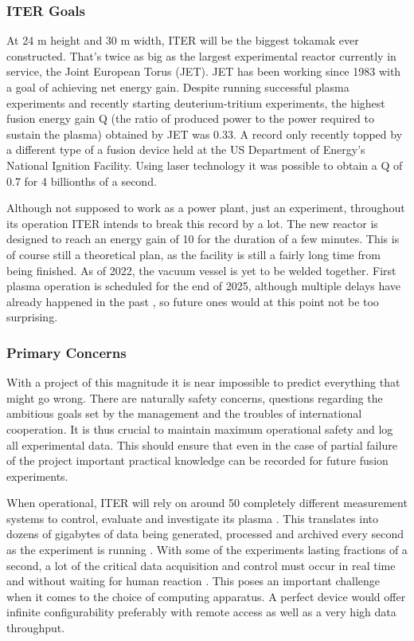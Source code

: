   \subsubsection{ITER Goals}

	At 24 m height and 30 m width, 
	ITER will be the biggest tokamak ever constructed. 
	That's twice as big as the largest experimental reactor currently in service, 
	the Joint European Torus (JET). JET has been working since 1983 with 
	a goal of achieving net energy gain. Despite running successful 
	plasma experiments and recently starting deuterium-tritium experiments,
	the highest fusion energy gain Q 
	(the ratio of produced power to the power required to sustain the plasma)
	obtained by JET was 0.33. A record only recently topped by a different 
	type of a fusion device held at the US Department of Energy’s
	National Ignition Facility. Using laser technology it was possible to
	obtain a Q of 0.7 for 4 billionths of a second. \cite{fusion_records}
	

	Although not supposed to work as a power plant, just an experiment,
	throughout its operation ITER intends to break this record by a lot.
	The new reactor is designed to reach an energy gain of 10 
	for the duration of a few minutes. This is of course still a theoretical
	plan, as the facility is still a fairly long time from being finished.
	As of 2022, the vacuum vessel is yet to be welded together\cite{iter_timeline}.
	First plasma operation is scheduled for the end of 2025\cite{iter_timeline},
	although multiple delays have already happened in the past \cite{iter_delays},
	so future ones would at this point not be too surprising. 

	\subsubsection{Primary Concerns}

	With a project of this magnitude it is near impossible to predict
	everything that might go wrong. There are naturally safety concerns,
	questions regarding the ambitious goals set by the management and
	the troubles of international cooperation\cite{iter_delays}.
	It is thus crucial to maintain maximum operational safety 
	and log all experimental data. This should ensure that even in the 
	case of partial failure of the project important practical knowledge
	can be recorded for future fusion experiments.


	When operational, ITER will rely on around 50 completely different
	measurement systems to control, evaluate and investigate its plasma 
	\cite{iter_diagnostics_count}.
	This translates into dozens of gigabytes of data being generated, 
	processed and archived every second as the experiment is running 
	\cite{iter_data_throughput}.
	With some of the experiments lasting fractions of a second,
	a lot of the critical data acquisition and control must occur
	in real time and without waiting for human reaction 
	\cite{iter_realtime_processing}.
	This poses an important challenge when it comes to the choice
	of computing apparatus. A perfect device would offer
	infinite configurability preferably with remote access 
	as well as a very high data throughput. 

